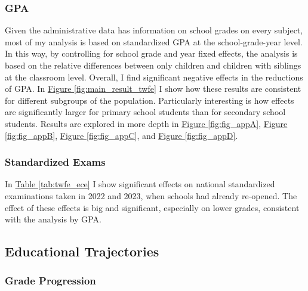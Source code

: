 
\subsubsection{GPA}

Given the administrative data has information on school grades on every subject, most of my analysis is based on standardized GPA at the school-grade-year level. In this way, by controlling for school grade and year fixed effects, the analysis is based on the relative differences between only children and children with siblings at the classroom level. Overall, I find significant negative effects in the reductions of GPA.  In \hyperref[fig:main_result_twfe]{Figure \ref{fig:main_result_twfe}} I show how these results are consistent for different subgroups of the population. Particularly interesting is how effects are significantly larger for primary school students than for secondary school students. Results are explored in more depth in \hyperref[fig:fig_appA]{Figure \ref{fig:fig_appA}}, \hyperref[fig:fig_appB]{Figure \ref{fig:fig_appB}}, \hyperref[fig:fig_appC]{Figure \ref{fig:fig_appC}}, and \hyperref[fig:fig_appD]{Figure \ref{fig:fig_appD}}.

\subsubsection{Standardized Exams}

In \hyperref[tab:twfe_ece]{Table \ref{tab:twfe_ece}}
I show significant effects on national standardized examinations taken in 2022 and 2023, when schools had already re-opened. The effect of these effects is big and significant, especially on lower grades, consistent with the analysis by GPA.

\subsection{Educational Trajectories}

\subsubsection{Grade Progression} 

